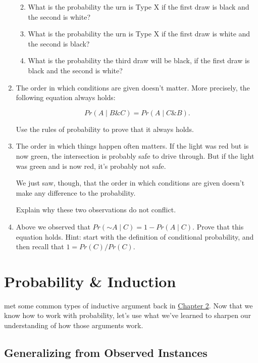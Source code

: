 \documentclass[justified]{tufte-book}
\providecommand{\tightlist}{%
  \setlength{\itemsep}{0pt}\setlength{\parskip}{0pt}}
\newcommand{\given}{\mid}
\renewcommand{\neg}{\mathbin{\sim}}
\renewcommand{\wedge}{\mathbin{\&}}
\newcommand{\p}{Pr}
\theoremstyle{definition}
\theoremstyle{definition}
\theoremstyle{definition}
\theoremstyle{remark}
\begin{document}
\begin{enumerate}
  \begin{enumerate}
  \def\labelenumii{\alph{enumii}.}
  \tightlist
  \item
    What is the probability the urn is Type X if the first draw is black
    and the second is white?
  \item
    What is the probability the urn is Type X if the first draw is white
    and the second is black?
  \item
    What is the probability the third draw will be black, if the first
    draw is black and the second is white?
  \end{enumerate}
\item
  The order in which conditions are given doesn't matter. More
  precisely, the following equation always holds:

  \[ \p(A \given B \wedge C) = \p(A \given C \wedge B).\]

  Use the rules of probability to prove that it always holds.
\item
  The order in which things happen often matters. If the light was red
  but is now green, the intersection is probably safe to drive through.
  But if the light was green and is now red, it's probably not safe.

  We just saw, though, that the order in which conditions are given
  doesn't make any difference to the probability.

  Explain why these two observations do not conflict.
\item
  Above we observed that \(\p(\neg A \given C) = 1 - \p(A \given C)\).
  Prove that this equation holds. Hint: start with the definition of
  conditional probability, and then recall that \(1 = \p(C) / \p(C)\).
\end{enumerate}

\hypertarget{probability-induction}{%
\chapter{Probability \& Induction}\label{probability-induction}}

 met some common types of inductive argument back in
\protect\hyperlink{indargs}{Chapter 2}. Now that we know how to work
with probability, let's use what we've learned to sharpen our
understanding of how those arguments work.

\hypertarget{generalizing-from-observed-instances}{%
\section{Generalizing from Observed
Instances}\label{generalizing-from-observed-instances}}
\end{document}
